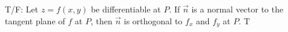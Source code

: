 {T/F: Let $z=f(x,y)$ be differentiable at $P$. If $\vec n$ is a normal vector to the tangent plane of $f$ at $P$, then $\vec n$ is orthogonal to $f_x$ and $f_y$ at $P$.
}
{T
}